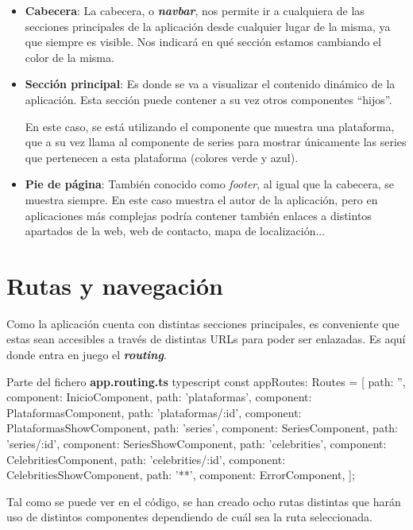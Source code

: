 \documentclass{\ClassPath/viu-tfm-template}
\begin{document}
\begin{itemize}
    \item \textbf{Cabecera}: La cabecera, o \textit{\textbf{navbar}}, nos permite ir a cualquiera de las secciones principales de la aplicación desde cualquier lugar de la misma, ya que siempre es visible. Nos indicará en qué sección estamos cambiando el color de la misma.

    \item \textbf{Sección principal}: Es donde se va a visualizar el contenido dinámico de la aplicación. Esta sección puede contener a su vez otros componentes “hijos”.

    En este caso, se está utilizando el componente que muestra una plataforma, que a su vez llama al componente de series para mostrar únicamente las series que pertenecen a esta plataforma (colores verde y azul).

    \item \textbf{Pie de página}: También conocido como \textit{footer}, al igual que la cabecera, se muestra siempre. En este caso muestra el autor de la aplicación, pero en aplicaciones más complejas podría contener también enlaces a distintos apartados de la web, web de contacto, mapa de localización...
\end{itemize}

\section{Rutas y navegación}
Como la aplicación cuenta con distintas secciones principales, es conveniente que estas sean accesibles a través de distintas URLs para poder ser enlazadas. Es aquí donde entra en juego el \textbf{\textit{routing}}.

\begin{mycode}{Parte del fichero \textbf{app.routing.ts} }{typescript}{}
const appRoutes: Routes = [
  {path: '', component: InicioComponent},
  {path: 'plataformas', component: PlataformasComponent},
  {path: 'plataformas/:id', component: PlataformasShowComponent},
  {path: 'series', component: SeriesComponent},
  {path: 'series/:id', component: SeriesShowComponent},
  {path: 'celebrities', component: CelebritiesComponent},
  {path: 'celebrities/:id', component: CelebritiesShowComponent},
  {path: '**', component: ErrorComponent},
];
\end{mycode}

Tal como se puede ver en el código, se han creado ocho rutas distintas que harán uso de distintos componentes dependiendo de cuál sea la ruta seleccionada.
\end{document}
